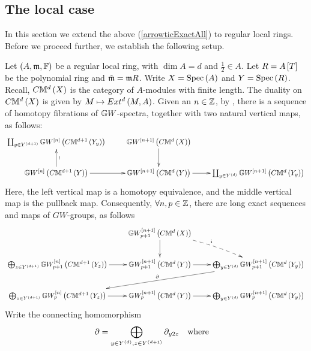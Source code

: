 \documentclass[12pt]{article}
\begin{document}
\subsection{The local case}
In this section we extend the above (\ref{arrowticExactAll}) to regular local rings.
Before we proceed further, we establish the following setup. 
\begin{setup}\label{chutuApp}{\rm 
Let $\left( A, \mathfrak {m}, {\mathbb{F}}\right)$ be a regular local ring, with $\dim A=d$ and $\frac{1}{2}\in A$.
 Let $R=A\left[ T\right]$ be the polynomial ring and $\tilde{\mathfrak {m}}={\mathfrak {m}}R$. Write $X=\mathrm{Spec}\left(A\right)$ and $Y=\mathrm{Spec}\left(R\right)$. Recall,
$C{\mathbb{M}}^d\left( X\right)$ is the category of $A$-modules with finite length. The duality on
$C{\mathbb{M}}^d\left( X\right)$  is given by $M \mapsto Ext^d\left( M, A\right)$. Given an  $n\in {\mathbb {Z}}$, by \cite[pp 473]{M23}, there is a sequence of homotopy fibrations of ${\mathbb{G}}W$-spectra, together with two natural vertical maps, as follows: 
$$
\diagram 
\coprod _{y\in Y^{\LRf{d+1}}}{\BG}W^{\LRt{n}}\LRf{C{\BM}^{d+1}\LRf{Y_y}} &
 {\BG}W^{\LRt{n+1}}\LRf{C{\BM}^{d}\LRf{X}}\ar[d]&\\
%
{\BG}W^{\LRt{n}}\LRf{C{\BM}^{d+1}\LRf{Y}}\ar[r]\ar[u]_{\wr} & {\BG}W^{\LRt{n+1}}\LRf{C{\BM}^{d}\LRf{Y}}\ar[r] & 
\coprod_{y\in Y^{\LRf{d}}}{\BG}W^{\LRt{n+1}}\LRf{C{\BM}^{d}\LRf{Y_y}}\\
\enddiagram
$$
Here,  the left  vertical map is a homotopy equivalence, and the middle vertical map is the pullback map. 
Consequently, $\forall n, p\in {\mathbb {Z}}$, there are long exact sequences and maps of $GW$-groups, as follows
\begin{equation}\label{23MayDegDelt}
\diagram 
& {\BG}W^{\LRt{n+1}}_{p+1}\LRf{C{\BM}^{d}\LRf{X}}\ar[d] \ar@/^/@{-->}[dr]^{\i}&\\
\bigoplus _{z\in Y^{\LRf{d+1}}}{\BG}W_{p+1}^{\LRt{n}}\LRf{C{\BM}^{d+1}\LRf{Y_z}}\ar[r] & {\BG}W_{p+1}^{\LRt{n+1}}\LRf{C{\BM}^{d}\LRf{Y}}\ar[r] & 
\bigoplus_{y\in Y^{\LRf{d}}}{\BG}W_{p+1}^{\LRt{n+1}}\LRf{C{\BM}^{d}\LRf{Y_y}}\ar[lld]_{\partial}\\
\bigoplus _{z\in Y^{\LRf{d+1}}}{\BG}W_{p}^{\LRt{n}}\LRf{C{\BM}^{d+1}\LRf{Y_z}}\ar[r] & {\BG}W_{p}^{\LRt{n+1}}\LRf{C{\BM}^{d}\LRf{Y}}\ar[r] & 
\bigoplus_{y\in Y^{\LRf{d}}}{\BG}W_{p}^{\LRt{n+1}}\LRf{C{\BM}^{d}\LRf{Y_y}}\\
\enddiagram
\end{equation}
Write the connecting homomorphism
$$
\partial=\bigoplus_{y\in Y^{\left( d\right)}, z\in Y^{\left( d+1\right)}} \partial_{y2z}\quad {\rm where} \quad 
$$}
\end{setup}
\end{document}
